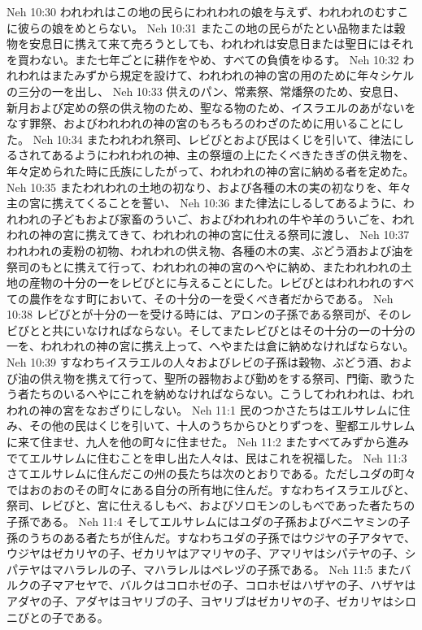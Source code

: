 Neh 10:30  われわれはこの地の民らにわれわれの娘を与えず、われわれのむすこに彼らの娘をめとらない。
Neh 10:31  またこの地の民らがたとい品物または穀物を安息日に携えて来て売ろうとしても、われわれは安息日または聖日にはそれを買わない。また七年ごとに耕作をやめ、すべての負債をゆるす。
Neh 10:32  われわれはまたみずから規定を設けて、われわれの神の宮の用のために年々シケルの三分の一を出し、
Neh 10:33  供えのパン、常素祭、常燔祭のため、安息日、新月および定めの祭の供え物のため、聖なる物のため、イスラエルのあがないをなす罪祭、およびわれわれの神の宮のもろもろのわざのために用いることにした。
Neh 10:34  またわれわれ祭司、レビびとおよび民はくじを引いて、律法にしるされてあるようにわれわれの神、主の祭壇の上にたくべきたきぎの供え物を、年々定められた時に氏族にしたがって、われわれの神の宮に納める者を定めた。
Neh 10:35  またわれわれの土地の初なり、および各種の木の実の初なりを、年々主の宮に携えてくることを誓い、
Neh 10:36  また律法にしるしてあるように、われわれの子どもおよび家畜のういご、およびわれわれの牛や羊のういごを、われわれの神の宮に携えてきて、われわれの神の宮に仕える祭司に渡し、
Neh 10:37  われわれの麦粉の初物、われわれの供え物、各種の木の実、ぶどう酒および油を祭司のもとに携えて行って、われわれの神の宮のへやに納め、またわれわれの土地の産物の十分の一をレビびとに与えることにした。レビびとはわれわれのすべての農作をなす町において、その十分の一を受くべき者だからである。
Neh 10:38  レビびとが十分の一を受ける時には、アロンの子孫である祭司が、そのレビびとと共にいなければならない。そしてまたレビびとはその十分の一の十分の一を、われわれの神の宮に携え上って、へやまたは倉に納めなければならない。
Neh 10:39  すなわちイスラエルの人々およびレビの子孫は穀物、ぶどう酒、および油の供え物を携えて行って、聖所の器物および勤めをする祭司、門衛、歌うたう者たちのいるへやにこれを納めなければならない。こうしてわれわれは、われわれの神の宮をなおざりにしない。
Neh 11:1  民のつかさたちはエルサレムに住み、その他の民はくじを引いて、十人のうちからひとりずつを、聖都エルサレムに来て住ませ、九人を他の町々に住ませた。
Neh 11:2  またすべてみずから進みでてエルサレムに住むことを申し出た人々は、民はこれを祝福した。
Neh 11:3  さてエルサレムに住んだこの州の長たちは次のとおりである。ただしユダの町々ではおのおのその町々にある自分の所有地に住んだ。すなわちイスラエルびと、祭司、レビびと、宮に仕えるしもべ、およびソロモンのしもべであった者たちの子孫である。
Neh 11:4  そしてエルサレムにはユダの子孫およびベニヤミンの子孫のうちのある者たちが住んだ。すなわちユダの子孫ではウジヤの子アタヤで、ウジヤはゼカリヤの子、ゼカリヤはアマリヤの子、アマリヤはシパテヤの子、シパテヤはマハラレルの子、マハラレルはペレヅの子孫である。
Neh 11:5  またバルクの子マアセヤで、バルクはコロホゼの子、コロホゼはハザヤの子、ハザヤはアダヤの子、アダヤはヨヤリブの子、ヨヤリブはゼカリヤの子、ゼカリヤはシロニびとの子である。
